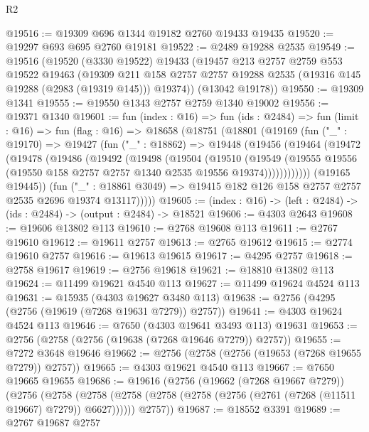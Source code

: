 \begin{lexlean}{R2}
\begin{coremodule}
@19516 := @19309 @696 @1344 @19182 @2760 @19433 @19435
@19520 := @19297 @693 @695 @2760 @19181
@19522 := @2489 @19288 @2535
@19549 := @19516
    (@19520
      (@3330 @19522)
      @19433
      (@19457
        @213
        @2757
        @2759
        @553
        @19522
        @19463
        (@19309
          @211
          @158
          @2757
          @2757
          @19288
          @2535
          (@19316 @145 @19288 (@2983 (@19319 @145)))
          @19374))
      (@13042 @19178))
@19550 := @19309 @1341
@19555 := @19550 @1343 @2757 @2759 @1340 @19002
@19556 := @19371 @1340
@19601 := fun (index : @16) =>
  fun (ids : @2484) =>
  fun (limit : @16) =>
  fun (flag : @16) =>
  @18658
    (@18751
      (@18801
        (@19169
          (fun ("_" : @19170) =>
          @19427
            (fun ("_" : @18862) =>
            @19448
              (@19456
                (@19464
                  (@19472
                    (@19478
                      (@19486
                        (@19492
                          (@19498
                            (@19504
                              (@19510
                                (@19549
                                  (@19555
                                    @19556
                                    (@19550 @158 @2757 @2757 @1340 @2535 @19556 @19374))))))))))))
              (@19165 @19445))
            (fun ("_" : @18861 @3049) =>
            @19415 @182 @126 @158 @2757 @2757 @2535 @2696 @19374 @13117)))))
@19605 := (index : @16) -> (left : @2484) -> (ids : @2484) -> (output : @2484) -> @18521
@19606 := @4303 @2643
@19608 := @19606 @13802 @113
@19610 := @2768 @19608 @113
@19611 := @2767 @19610
@19612 := @19611 @2757
@19613 := @2765 @19612
@19615 := @2774 @19610 @2757
@19616 := @19613 @19615
@19617 := @4295 @2757
@19618 := @2758 @19617
@19619 := @2756 @19618
@19621 := @18810 @13802 @113
@19624 := @11499 @19621 @4540 @113
@19627 := @11499 @19624 @4524 @113
@19631 := @15935 (@4303 @19627 @3480 @113)
@19638 := @2756 (@4295 (@2756 (@19619 (@7268 @19631 @7279)) @2757))
@19641 := @4303 @19624 @4524 @113
@19646 := @7650 (@4303 @19641 @3493 @113) @19631
@19653 := @2756 (@2758 (@2756 (@19638 (@7268 @19646 @7279)) @2757))
@19655 := @7272 @3648 @19646
@19662 := @2756 (@2758 (@2756 (@19653 (@7268 @19655 @7279)) @2757))
@19665 := @4303 @19621 @4540 @113
@19667 := @7650 @19665 @19655
@19686 := @19616
    (@2756
      (@19662 (@7268 @19667 @7279))
      (@2756
        (@2758 (@2758 (@2758 (@2758 (@2758 (@2756 (@2761 (@7268 (@11511 @19667) @7279)) @6627))))))
        @2757))
@19687 := @18552 @3391
@19689 := @2767 @19687 @2757

\end{coremodule}
\end{lexlean}
